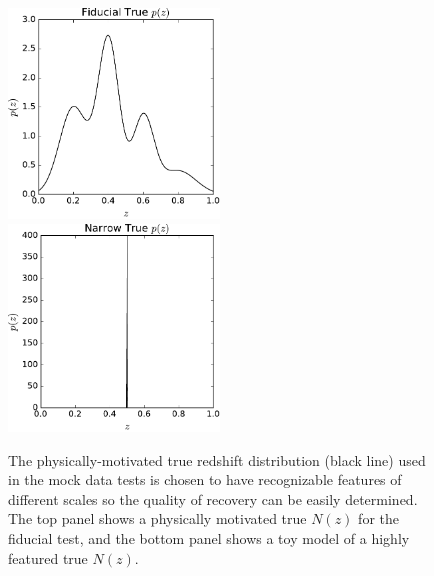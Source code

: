 \documentclass[preprint]{aastex}
\begin{document}
\begin{figure}
\includegraphics[width=0.5\textwidth]{figs/null/physPz.pdf}\\
\includegraphics[width=0.5\textwidth]{figs/delt/physPz.pdf}
\caption{The physically-motivated true redshift distribution (black line) used 
in the mock data tests is chosen to have recognizable features of different 
scales so the quality of recovery can be easily determined.  The top panel 
shows a physically motivated true $N(z)$ for the fiducial test, and the bottom 
panel shows a toy model of a highly featured true $N(z)$.}
\label{fig:physpz}
\end{figure}
\end{document}
